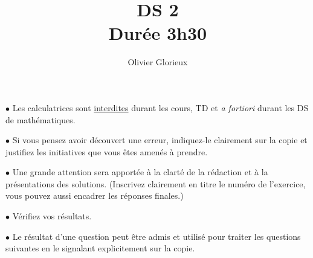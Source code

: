 \documentclass[a4paper, 11pt,reqno]{article}
\author{Olivier Glorieux}
\begin{document}
\title{DS 2\\
\Large{Durée 3h30}
}

\vspace{1cm}
\begin{center}

\begin{description}
\item$\bullet$ Les calculatrices sont \underline{interdites} durant les cours, TD et \emph{a fortiori} durant les DS de mathématiques. \\

\item $\bullet $ Si vous pensez avoir découvert une erreur, indiquez-le clairement sur la copie et justifiez les initiatives que vous êtes amenés à prendre. \\

\item $\bullet$ Une grande attention sera apportée à la clarté de la rédaction et à la présentations des solutions. (Inscrivez clairement en titre le numéro de l'exercice, vous pouvez aussi encadrer les réponses finales.)  \\

\item $\bullet$ Vérifiez vos résultats. \\

\item $\bullet$ Le résultat d'une question peut être admis et utilisé pour traiter les questions suivantes en le signalant explicitement sur la copie. 
\end{description}

\end{center} 
\vspace{2cm}
\end{document}
